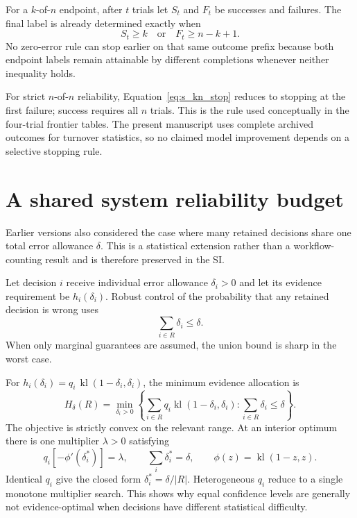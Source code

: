 \documentclass[11pt,letterpaper]{article}
\theoremstyle{plain}
\newcommand{\1}{\mathbf 1}
\begin{document}
For a $k$-of-$n$ endpoint, after $t$ trials let $S_t$ and $F_t$ be successes and failures. The final label is already determined exactly when
\begin{equation}
 S_t\ge k
 \quad\text{or}\quad
 F_t\ge n-k+1.
\label{eq:s_kn_stop}
\end{equation}
No zero-error rule can stop earlier on that same outcome prefix because both endpoint labels remain attainable by different completions whenever neither inequality holds.

For strict $n$-of-$n$ reliability, Equation~\ref{eq:s_kn_stop} reduces to stopping at the first failure; success requires all $n$ trials. This is the rule used conceptually in the four-trial frontier tables. The present manuscript uses complete archived outcomes for turnover statistics, so no claimed model improvement depends on a selective stopping rule.

\section{A shared system reliability budget}
Earlier versions also considered the case where many retained decisions share one total error allowance $\delta$. This is a statistical extension rather than a workflow-counting result and is therefore preserved in the SI.

Let decision $i$ receive individual error allowance $\delta_i>0$ and let its evidence requirement be $h_i(\delta_i)$. Robust control of the probability that any retained decision is wrong uses
\begin{equation}
 \sum_{i\in R}\delta_i\le\delta.
\label{eq:s_union_budget}
\end{equation}
When only marginal guarantees are assumed, the union bound is sharp in the worst case.

For $h_i(\delta_i)=q_i\,\operatorname{kl}(1-\delta_i,\delta_i)$, the minimum evidence allocation is
\begin{equation}
 H_\delta(R)=\min_{\delta_i>0}
 \left\{\sum_{i\in R}q_i\operatorname{kl}(1-\delta_i,\delta_i):
 \sum_{i\in R}\delta_i\le\delta\right\}.
\label{eq:s_reliability_alloc}
\end{equation}
The objective is strictly convex on the relevant range. At an interior optimum there is one multiplier $\lambda>0$ satisfying
\begin{equation}
 q_i\left[-\phi'(\delta_i^*)\right]=\lambda,
 \qquad \sum_i\delta_i^*=\delta,
 \qquad \phi(z)=\operatorname{kl}(1-z,z).
\label{eq:s_reliability_kkt}
\end{equation}
Identical $q_i$ give the closed form $\delta_i^*=\delta/|R|$. Heterogeneous $q_i$ reduce to a single monotone multiplier search. This shows why equal confidence levels are generally not evidence-optimal when decisions have different statistical difficulty.
\end{document}
